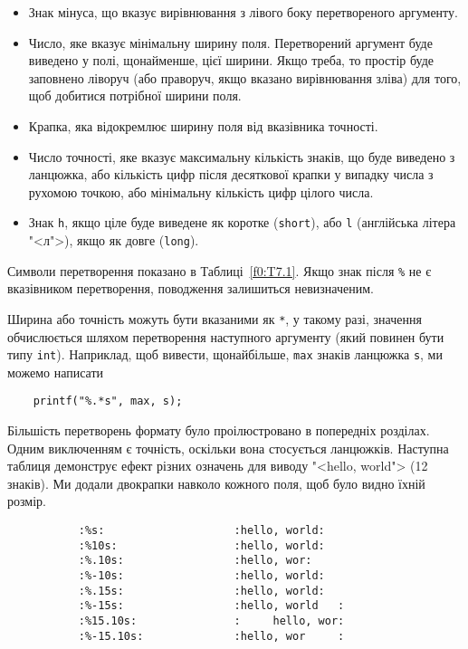 \documentclass[a4paper,12pt]{book}
\begin{document}
  \begin{itemize}    
    \item Знак мінуса, що вказує вирівнювання з лівого боку перетвореного аргументу.
    \item Число, яке вказує мінімальну ширину поля. Перетворений аргумент буде виведено у
    полі, щонайменше, цієї ширини. Якщо треба, то простір буде заповнено ліворуч (або
    праворуч, якщо вказано вирівнювання зліва) для того, щоб добитися потрібної ширини
    поля.
    \item Крапка, яка відокремлює ширину поля від вказівника точності.
    \item Число точності, яке вказує максимальну кількість знаків, що буде виведено з
    ланцюжка, або кількість цифр після десяткової крапки у випадку числа з рухомою
    точкою, або мінімальну кількість цифр цілого числа.
    \item Знак \texttt{h}, якщо ціле буде виведене як коротке (\texttt{short}), або
    \texttt{l} (англійська літера "<л">), якщо як довге (\texttt{long}).
  \end{itemize}

  Символи перетворення показано в Таблиці~\ref{f0:T7.1}. Якщо знак після
  \texttt{\%} не є вказівником перетворення, поводження залишиться невизначеним.
                                    
  Ширина або точність можуть бути вказаними як \texttt{*}, у такому разі, значення
  обчислюється шляхом перетворення наступного аргументу (який повинен бути типу
  \texttt{int}). Наприклад, щоб вивести, щонайбільше, \texttt{max} знаків ланцюжка
  \texttt{s}, ми можемо написати
  \begin{verbatim}
    printf("%.*s", max, s);
  \end{verbatim}

  Більшість перетворень формату було проілюстровано в попередніх розділах. Одним
  виключенням є точність, оскільки вона стосується ланцюжків. Наступна таблиця
  демонструє ефект різних означень для виводу "<hello, world"> (12 знаків). Ми
  додали двокрапки навколо кожного поля, щоб було видно їхній розмір.
  \begin{verbatim}
           :%s:                    :hello, world:
           :%10s:                  :hello, world:
           :%.10s:                 :hello, wor:
           :%-10s:                 :hello, world:
           :%.15s:                 :hello, world:
           :%-15s:                 :hello, world   :
           :%15.10s:               :     hello, wor:
           :%-15.10s:              :hello, wor     :
  \end{verbatim}
\end{document}
